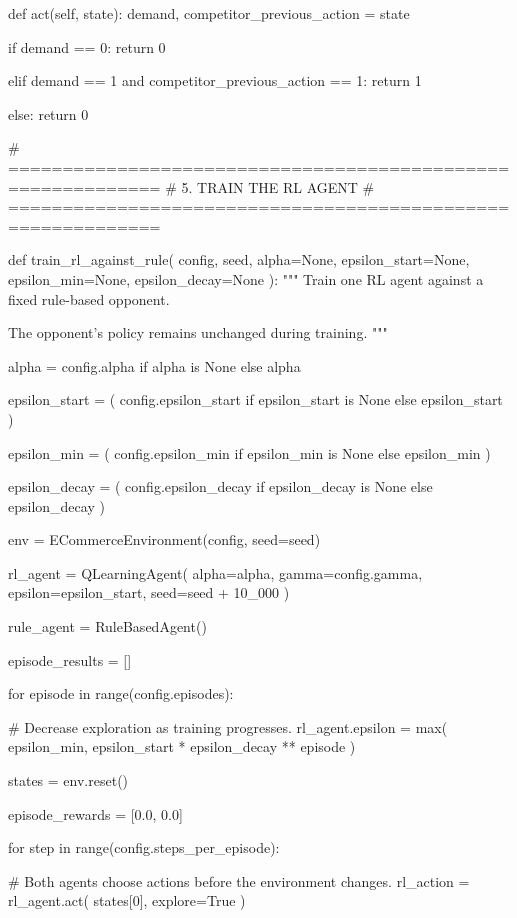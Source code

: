     def act(self, state):
        demand, competitor_previous_action = state

        if demand == 0:
            return 0

        elif demand == 1 and competitor_previous_action == 1:
            return 1

        else:
            return 0


# ============================================================
# 5. TRAIN THE RL AGENT
# ============================================================

def train_rl_against_rule(
    config,
    seed,
    alpha=None,
    epsilon_start=None,
    epsilon_min=None,
    epsilon_decay=None
):
    """
    Train one RL agent against a fixed rule-based opponent.

    The opponent's policy remains unchanged during training.
    """

    alpha = config.alpha if alpha is None else alpha

    epsilon_start = (
        config.epsilon_start
        if epsilon_start is None
        else epsilon_start
    )

    epsilon_min = (
        config.epsilon_min
        if epsilon_min is None
        else epsilon_min
    )

    epsilon_decay = (
        config.epsilon_decay
        if epsilon_decay is None
        else epsilon_decay
    )

    env = ECommerceEnvironment(config, seed=seed)

    rl_agent = QLearningAgent(
        alpha=alpha,
        gamma=config.gamma,
        epsilon=epsilon_start,
        seed=seed + 10_000
    )

    rule_agent = RuleBasedAgent()

    episode_results = []

    for episode in range(config.episodes):

        # Decrease exploration as training progresses.
        rl_agent.epsilon = max(
            epsilon_min,
            epsilon_start * epsilon_decay ** episode
        )

        states = env.reset()

        episode_rewards = [0.0, 0.0]

        for step in range(config.steps_per_episode):

            # Both agents choose actions before the environment changes.
            rl_action = rl_agent.act(
                states[0], explore=True
            )

